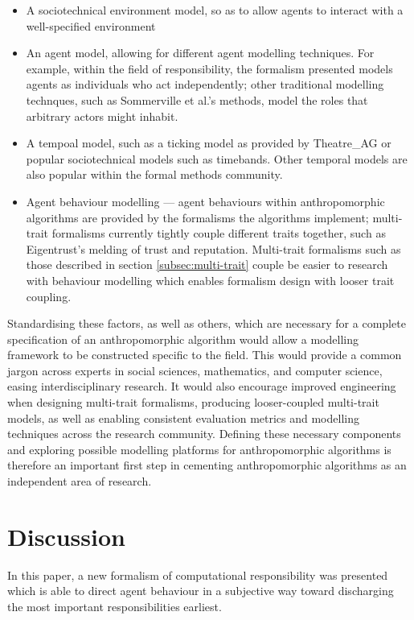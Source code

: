 \begin{itemize}
    \item A sociotechnical environment model, so as to allow agents to interact with a well-specified environment
    \item An agent model, allowing for different agent modelling techniques. For example, within the field of responsibility, the formalism presented models agents as individuals who act independently; other traditional modelling technques, such as Sommerville et al.'s methods, model the roles that arbitrary actors might inhabit.
    \item A tempoal model, such as a ticking model as provided by Theatre\_AG or popular sociotechnical models such as timebands\cite{Burns2006}. Other temporal models are also popular within the formal methods community.
    \item Agent behaviour modelling --- agent behaviours within anthropomorphic algorithms are provided by the formalisms the algorithms implement; multi-trait formalisms currently tightly couple different traits together, such as Eigentrust's melding of trust and reputation. Multi-trait formalisms such as those described in section \ref{subsec:multi-trait} couple be easier to research with behaviour modelling which enables formalism design with looser trait coupling.
\end{itemize}

Standardising these factors, as well as others, which are necessary for a complete specification of an anthropomorphic algorithm would allow a modelling framework to be constructed specific to the field. This would provide a common jargon across experts in social sciences, mathematics, and computer science, easing interdisciplinary research. It would also encourage improved engineering when designing multi-trait formalisms, producing looser-coupled multi-trait models, as well as enabling consistent evaluation metrics and modelling techniques across the research community. Defining these necessary components and exploring possible modelling platforms for anthropomorphic algorithms is therefore an important first step in cementing anthropomorphic algorithms as an independent area of research.\par

\section{Discussion}\label{sec:discussion}
In this paper, a new formalism of computational responsibility was presented which is able to direct agent behaviour in a subjective way toward discharging the most important responsibilities earliest.\par

